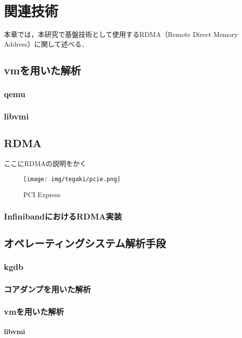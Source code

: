 \chapter{関連技術}
\label{chap:related_works}

本章では，本研究で基盤技術として使用するRDMA（Remote Direct Memory Address）に関して述べる．

\section{vmを用いた解析}

\subsection{qemu}

\subsection{libvmi}

\section{RDMA}

ここにRDMAの説明をかく

\begin{figure}[htbp]
    \caption{PCI Express}
    \label{fig:zentai}
    \begin{center}
        \texttt{[image: img/tegaki/pcie.png]}
    \end{center}
\end{figure}

\subsection{InfinibandにおけるRDMA実装}

\section{オペレーティングシステム解析手段}

\subsection{kgdb}

\subsection{コアダンプを用いた解析}

\subsection{vmを用いた解析}

\subsubsection{libvmi}
